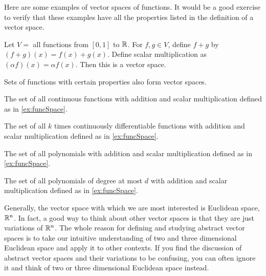 Here are some examples of vector spaces of functions. It would be a good
exercise to verify that these examples have all the properties listed
in the definition of a vector space. 
\begin{example} \label{ex:funcSpace}
  Let $V = $ all functions from $[0,1]$ to $\mathbb{R}$. For $f, g \in V$,
  define $f + g$ by $(f+g)(x) = f(x) + g(x)$. Define scalar
  multiplication as $(\alpha f)(x) = \alpha f(x)$. Then this is a
  vector space. 
\end{example}
Sets of functions with certain properties also form vector spaces. 
\begin{example}
  The set of all continuous functions with addition and scalar
  multiplication defined as in \ref{ex:funcSpace}.
\end{example}
\begin{example}
  The set of all $k$ times continuously differentiable functions with
  addition and scalar multiplication defined as in \ref{ex:funcSpace}.
\end{example}
\begin{example}
  The set of all polynomials with addition and scalar
  multiplication defined as in \ref{ex:funcSpace}.
\end{example}
\begin{example} 
  The set of all polynomials of degree at most $d$ with addition and scalar
  multiplication defined as in \ref{ex:funcSpace}.
\end{example}

Generally, the vector space with which we are most interested is
Euclidean space, $\mathbb{R}^n$. In fact, a good way to think about other
vector spaces is that they are just variations of $\mathbb{R}^n$. The whole
reason for defining and studying abstract vector spaces is to take our
intuitive understanding of two and three dimensional Euclidean space
and apply it to other contexts. If you find the discussion of abstract
vector spaces and their variations to be confusing, you can often
ignore it and think of two or three dimensional Euclidean space
instead.

